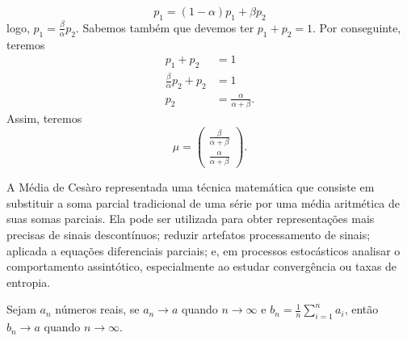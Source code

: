 \begin{example}
  \begin{equation}
    p_1 = (1-\alpha) p_1 + \beta p_2
  \end{equation}
  logo, $p_1 = \frac{\beta}{\alpha} p_2$.
  Sabemos também que devemos ter $p_1 + p_2 = 1$. Por conseguinte, teremos
  \begin{subequations}
  \begin{align}
    p_1 + p_2 &= 1 \\
    \frac{\beta}{\alpha} p_2 + p_2 &= 1 \\
    p_2 &= \frac{\alpha}{\alpha + \beta} .
  \end{align}
  \end{subequations}
  Assim, teremos
  \begin{equation}
    \mu = \begin{pmatrix} \frac{\beta}{\alpha + \beta} \\ \frac{\alpha}{\alpha + \beta} \end{pmatrix} .
  \end{equation}
\end{example}



A Média de Cesàro representada uma técnica matemática que consiste em
substituir a soma parcial tradicional de uma série por uma média aritmética de
suas somas parciais.
Ela pode ser utilizada para obter representações mais precisas de sinais descontínuos;
reduzir artefatos processamento de sinais; aplicada a equações diferenciais parciais;
e, em processos estocásticos analisar o comportamento assintótico, especialmente ao 
estudar convergência ou taxas de entropia.

\begin{lemma}
  Sejam $a_n$ números reais, se $a_n \rightarrow a$ quando $n \rightarrow \infty$ e $b_n = \frac{1}{n} \sum_{i=1}^n a_i$,
  então $b_n \rightarrow a$ quando $n \rightarrow \infty$.
\end{lemma}

